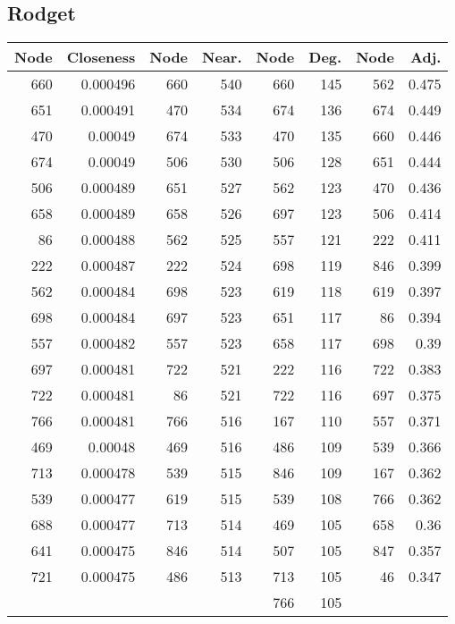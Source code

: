 \subsection*{Rodget}
\begin{center}
\begin{tabular}{rrrrrrrr}
\hline
   Node &   Closeness &   Node &   Near. &   Node &   Deg. &   Node &   Adj. \\
\hline
    660 &    0.000496 &    660 &     540 &    660 &    145 &    562 &  0.475 \\
    651 &    0.000491 &    470 &     534 &    674 &    136 &    674 &  0.449 \\
    470 &    0.00049  &    674 &     533 &    470 &    135 &    660 &  0.446 \\
    674 &    0.00049  &    506 &     530 &    506 &    128 &    651 &  0.444 \\
    506 &    0.000489 &    651 &     527 &    562 &    123 &    470 &  0.436 \\
    658 &    0.000489 &    658 &     526 &    697 &    123 &    506 &  0.414 \\
     86 &    0.000488 &    562 &     525 &    557 &    121 &    222 &  0.411 \\
    222 &    0.000487 &    222 &     524 &    698 &    119 &    846 &  0.399 \\
    562 &    0.000484 &    698 &     523 &    619 &    118 &    619 &  0.397 \\
    698 &    0.000484 &    697 &     523 &    651 &    117 &     86 &  0.394 \\
    557 &    0.000482 &    557 &     523 &    658 &    117 &    698 &  0.39  \\
    697 &    0.000481 &    722 &     521 &    222 &    116 &    722 &  0.383 \\
    722 &    0.000481 &     86 &     521 &    722 &    116 &    697 &  0.375 \\
    766 &    0.000481 &    766 &     516 &    167 &    110 &    557 &  0.371 \\
    469 &    0.00048  &    469 &     516 &    486 &    109 &    539 &  0.366 \\
    713 &    0.000478 &    539 &     515 &    846 &    109 &    167 &  0.362 \\
    539 &    0.000477 &    619 &     515 &    539 &    108 &    766 &  0.362 \\
    688 &    0.000477 &    713 &     514 &    469 &    105 &    658 &  0.36  \\
    641 &    0.000475 &    846 &     514 &    507 &    105 &    847 &  0.357 \\
    721 &    0.000475 &    486 &     513 &    713 &    105 &     46 &  0.347 \\
        &             &        &         &    766 &    105 &        &        \\
\hline
\end{tabular}
\end{center}
